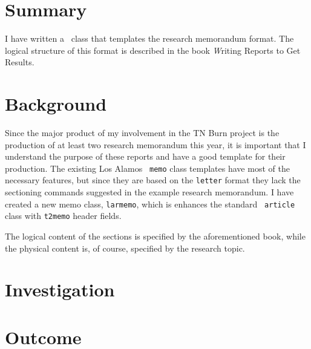 \documentclass[11pt]{larmemo}
\begin{document}
\maketitle			%

\section{Summary}
I have written a \LaTeXe\ class that templates the research memorandum
format.  The logical structure of this format is described in the book
{\emph Writing Reports to Get Results}.

\section{Background}
Since the major product of my involvement in the TN Burn project is
the production of at least two research memorandum this year, it is
important that I understand the purpose of these reports and have a
good template for their production.  The existing Los Alamos {\tt
memo} class templates have most of the necessary features, but since
they are based on the {\tt letter} format they lack the sectioning
commands suggested in the example research memorandum.  I have created
a new memo class, {\tt larmemo}, which is enhances the standard {\tt
article} class with {\tt t2memo} header fields.

The logical content of the sections is specified by the
aforementioned book, while the physical content is, of course,
specified by the research topic.

\newpage

\section{Investigation}


\section{Outcome}
\end{document}
